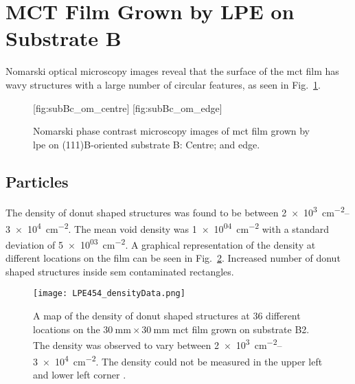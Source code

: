 \clearpage
\section{MCT Film Grown by LPE on Substrate B}\label{sec:subBc}

Nomarski optical microscopy images reveal that the surface of the \ac{mct} film has wavy structures with a large number of circular features, as seen in Fig.~\ref{fig:subBc_om}.

\begin{figure}[htbp]
    \centering
    [fig:subBc_om_centre]
    \hfill
    [fig:subBc_om_edge]
    \caption[Nomarski phase contrast microscopy images of \ac{mct} film grown by \ac{lpe} on substrate B.]{Nomarski phase contrast microscopy images of \ac{mct} film grown by \ac{lpe} on (111)B-oriented substrate B:  Centre; and  edge.}
    \label{fig:subBc_om}
\end{figure}

\subsection{Particles}



The density of donut shaped structures was found to be between \SIrange{2e+3}{3e+4}{\centi\metre^{-2}}. The mean void density was \SI{1e+04}{\centi\metre^{-2}} with a standard deviation of \SI{5e+03}{\centi\metre^{-2}}. A graphical representation of the density at different locations on the film can be seen in Fig.~\ref{fig:LPE454_densityData}. Increased number of donut shaped structures inside \ac{sem} contaminated rectangles.

\begin{figure}[htbp]
    \centering
    \texttt{[image: LPE454\_densityData.png]}
    \caption[Map of the density of donut shaped structures on the \ac{mct} film grown on substrate B2.]{A map of the density of donut shaped structures at 36 different locations on the $\SI{30}{\milli\metre}\times\SI{30}{\milli\metre}$ \ac{mct} film grown on substrate B2. The density was observed to vary between \SIrange{2e+3}{3e+4}{\centi\metre^{-2}}. The density could not be measured in the upper left and lower left corner .}
    \label{fig:LPE454_densityData}
\end{figure}

